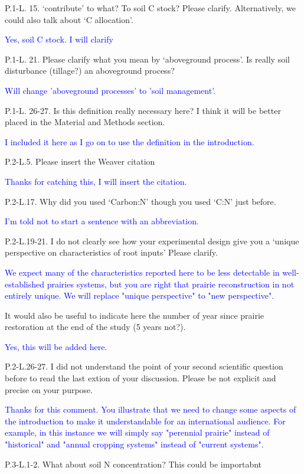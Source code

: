 \documentclass[]{article}
\begin{document}
P.1-L. 15. `contribute' to what? To soil C stock? Please clarify.
Alternatively, we could also talk about `C allocation'.

\textcolor{blue}{Yes, soil C stock. I will clarify}

P.1-L. 21. Please clarify what you mean by `aboveground process'. Is
really soil disturbance (tillage?) an aboveground process?

\textcolor{blue}{Will change 'aboveground processes' to 'soil management'.}

P.1-L. 26-27. Is this definition really necessary here? I think it will
be better placed in the Material and Methods section.

\textcolor{blue}{I included it here as I go on to use the definition in the introduction.}

P.2-L.5. Please insert the Weaver citation

\textcolor{blue}{Thanks for catching this, I will insert the citation.}

P.2-L.17. Why did you used `Carbon:N' though you used `C:N' just before.

\textcolor{blue}{I'm told not to start a sentence with an abbreviation.}

P.2-L.19-21. I do not clearly see how your experimental design give you
a `unique perspective on characteristics of root inputs' Please clarify.

\textcolor{blue}{We expect many of the characteristics reported here to be less detectable in well-established prairies systems, but you are right that prairie reconstruction in not entirely unique. We will replace "unique perspective" to "new perspective".}

It would also be useful to indicate here the number of year since
prairie restoration at the end of the study (5 years not?).

\textcolor{blue}{Yes, this will be added here.}

P.2-L.26-27. I did not understand the point of your second scientific
question before to read the last extion of your discussion. Please be
not explicit and precise on your purpose.

\textcolor{blue}{Thanks for this comment. You illustrate that we need to change some aspects of the introduction to make it understandable for an international audience. For example, in this instance we will simply say "perennial prairie" instead of "historical" and "annual cropping systems" instead of "current systems".}

P.3-L.1-2. What about soil N concentration? This could be importabnt
\end{document}
